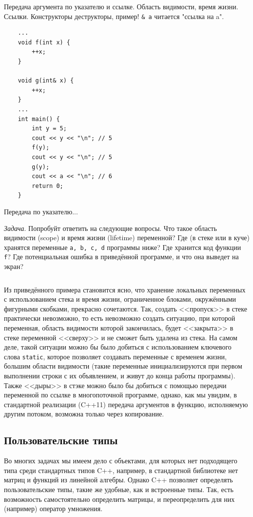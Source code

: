 \documentclass{book}
\begin{document}
Передача аргумента по указателю и ссылке. Область видимости, время жизни.
Ссылки. Конструкторы деструкторы, пример! \texttt{& a} читается "ссылка на a".
\begin{verbatim}
    ...
    void f(int x) {
        ++x; 
    }

    void g(int& x) {
        ++x; 
    }
    ... 
    int main() {
        int y = 5; 
        cout << y << "\n"; // 5 
        f(y); 
        cout << y << "\n"; // 5 
        g(y); 
        cout << a << "\n"; // 6
        return 0;
    }
\end{verbatim}
Передача по указателю...

{\it Задача}. Попробуйт ответить на следующие вопросы. Что такое область видимости
(scope) и время жизни (lifetime) переменной? Где (в стеке или в куче) хранятся переменные
\texttt{a, b, c, d} программы ниже? Где хранится код функции \texttt{f}? Где
потенциальная ошибка в приведённой программе, и что она выведет на экран?

\inputminted{cpp}{lifetime.cpp}

Из приведённого примера становится ясно, что хранение локальных переменных с использованием стека и
время жизни, ограниченное блоками, окружёнными фигурными скобками, прекрасно сочетаются. Так,
создать <<пропуск>> в стеке практически невозможно, то есть невозможно создать ситуацию, при
которой переменная, область видимости которой закончилась, будет <<закрыта>> в стеке переменной
<<сверху>> и не сможет быть удалена из стека. На самом деле, такой ситуации можно бы было добиться
с использованием ключевого слова \texttt{static}, которое позволяет создавать переменные с
временем жизни, большим области видимости (такие переменные инициализируются при первом выполнении
строки с их объявлением, и живут до конца работы программы). Также <<дыры>> в стэке можно было бы
добиться с помощью передачи переменной по ссылке в многопоточной программе, однако, как мы увидим,
в стандартной реализации (C++11) передача аргументов в функцию, исполняемую другим потоком,
возможна только через копирование.

\subsection{Пользовательские типы}

Во многих задачах мы имеем дело с объектами, для которых нет подходящего типа среди стандартных
типов C++, например, в стандартной библиотеке нет матриц и функций из линейной алгебры. Однако C++
позволяет определять пользовательские типы, такие же удобные, как и встроенные типы. Так, есть
возможность самостоятельно определить матрицы, и переопределить для них (например) оператор
умножения.
\end{document}
